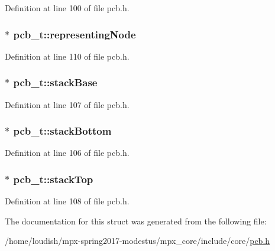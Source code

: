 Definition at line 100 of file pcb.\+h.

\subsubsection[{\texorpdfstring{representing\+Node}{representingNode}}]{$\ast$ pcb\+\_\+t\+::representing\+Node}\hypertarget{structs__pcb__stuct_a56fe193ec1b8061c850d79247bccb98d}{}\label{structs__pcb__stuct_a56fe193ec1b8061c850d79247bccb98d}


Definition at line 110 of file pcb.\+h.

\subsubsection[{\texorpdfstring{stack\+Base}{stackBase}}]{$\ast$ pcb\+\_\+t\+::stack\+Base}\hypertarget{structs__pcb__stuct_a3fd35f3889ce588dc9af9b0c74fd2db9}{}\label{structs__pcb__stuct_a3fd35f3889ce588dc9af9b0c74fd2db9}


Definition at line 107 of file pcb.\+h.

\subsubsection[{\texorpdfstring{stack\+Bottom}{stackBottom}}]{$\ast$ pcb\+\_\+t\+::stack\+Bottom}\hypertarget{structs__pcb__stuct_aec0fa5de5c09ee7db1da3b953af71321}{}\label{structs__pcb__stuct_aec0fa5de5c09ee7db1da3b953af71321}


Definition at line 106 of file pcb.\+h.

\subsubsection[{\texorpdfstring{stack\+Top}{stackTop}}]{$\ast$ pcb\+\_\+t\+::stack\+Top}\hypertarget{structs__pcb__stuct_a8ea780f48f7f2a4f9e337abaf510896e}{}\label{structs__pcb__stuct_a8ea780f48f7f2a4f9e337abaf510896e}


Definition at line 108 of file pcb.\+h.



The documentation for this struct was generated from the following file\+:\begin{DoxyCompactItemize}
\item 
/home/loudish/mpx-\/spring2017-\/modestus/mpx\+\_\+core/include/core/\hyperlink{pcb_8h}{pcb.\+h}\end{DoxyCompactItemize}
